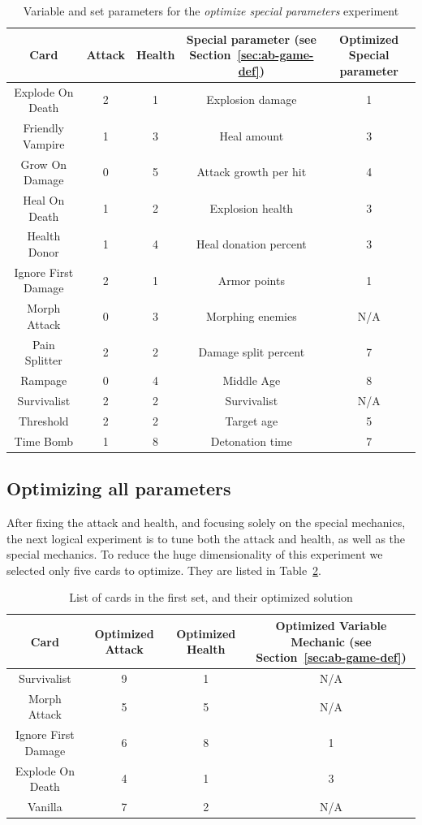 \begin{table}[t]
\centering
\begin{tabular}{||c c c c c||} 
 \hline
 Card & Attack & Health & Special parameter (see Section~\ref{sec:ab-game-def}) & Optimized Special parameter \\ [0.5ex] 
 \hline\hline
 Explode On Death & 2 & 1 & Explosion damage & 1\\ 
 \hline
 Friendly Vampire & 1 & 3 & Heal amount & 3 \\
 \hline
 Grow On Damage & 0 & 5 & Attack growth per hit & 4 \\
 \hline
 Heal On Death & 1 & 2 & Explosion health & 3 \\
 \hline
 Health Donor & 1 & 4 & Heal donation percent & 3 \\
 \hline
 Ignore First Damage & 2 & 1 & Armor points & 1 \\
 \hline
 Morph Attack & 0 & 3 & Morphing enemies & N/A \\
 \hline
 Pain Splitter & 2 & 2 & Damage split percent & 7 \\
 \hline
 Rampage & 0 & 4 & Middle Age & 8 \\
 \hline
 Survivalist & 2 & 2 & Survivalist & N/A \\
 \hline
 Threshold & 2 & 2 & Target age & 5 \\
 \hline
 Time Bomb & 1 & 8 & Detonation time & 7 \\ 
 \hline
\end{tabular}
\caption{Variable and set parameters for the \textit{optimize special parameters} experiment}
\label{tab:special_cards}
\end{table}

\subsection{Optimizing all parameters} \label{sec:first_set}

After fixing the attack and health, and focusing solely on the special mechanics, the next logical experiment is to tune both the attack and health, as well as the special mechanics. To reduce the huge dimensionality of this experiment we selected only five cards to optimize. They are listed in Table~\ref{tab:first_set}.

\begin{table}[t]
\centering
\begin{tabular}{||c c c c||} 
 \hline
 Card & Optimized Attack & Optimized Health & Optimized Variable Mechanic (see Section~\ref{sec:ab-game-def})\\ [0.5ex]
 \hline
 Survivalist & 9 & 1 & N/A \\
 \hline
 Morph Attack & 5 & 5 & N/A \\
 \hline
 Ignore First Damage & 6 & 8 & 1 \\
 \hline
 Explode On Death & 4 & 1 & 3 \\ 
 \hline
 Vanilla & 7 & 2 & N/A \\
 \hline
\end{tabular}
\caption{List of cards in the first set, and their optimized solution}
\label{tab:first_set}
\end{table}


